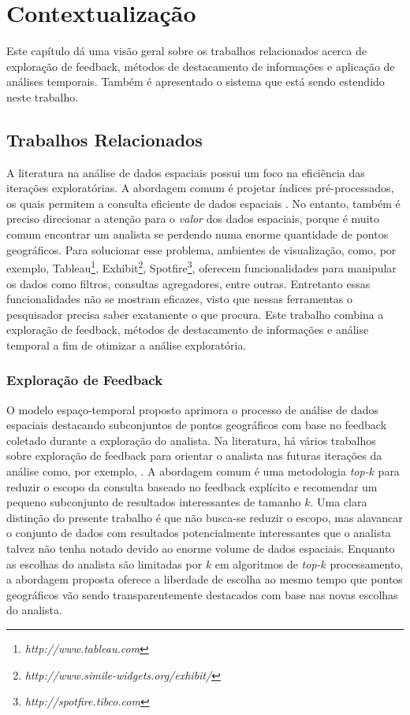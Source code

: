 \chapter{Contextualização}
\label{chap:contextualizacao}

Este capítulo dá uma visão geral sobre os trabalhos relacionados acerca de exploração de feedback, métodos de destacamento de informações e aplicação de análises temporais. Também é apresentado o sistema que está sendo estendido neste trabalho.

\section{Trabalhos Relacionados}

A literatura na análise de dados espaciais possui um foco na eficiência das iterações exploratórias. A abordagem comum é projetar índices pré-processados, os quais permitem a consulta eficiente de dados espaciais \cite{lins2013nanocubes}. No entanto, também é preciso direcionar a atenção para o {\em valor} dos dados espaciais, porque é muito comum encontrar um analista se perdendo numa enorme quantidade de pontos geográficos. Para solucionar esse problema, ambientes de visualização, como, por exemplo, Tableau\footnote{\em http://www.tableau.com}, Exhibit\footnote{\em http://www.simile-widgets.org/exhibit/}, Spotfire\footnote{\em  http://spotfire.tibco.com}, oferecem funcionalidades para manipular os dados como filtros, consultas agregadores, entre outras. Entretanto essas funcionalidades não se mostram eficazes, visto que nessas ferramentas o pesquisador precisa saber exatamente o que procura. Este trabalho combina a exploração de feedback, métodos de destacamento de informações e análise temporal a fim de otimizar a análise exploratória.

\subsection{Exploração de Feedback}

O modelo espaço-temporal proposto aprimora o processo de análise de dados espaciais destacando subconjuntos de pontos geográficos com base no feedback coletado durante a exploração do analista. Na literatura, há vários trabalhos sobre exploração de feedback para orientar o analista nas futuras iterações da análise como, por exemplo, . A abordagem comum é uma metodologia {\em top-$k$} para reduzir o escopo da consulta baseado no feedback explícito e recomendar um pequeno subconjunto de resultados interessantes de tamanho $k$. Uma clara distinção do presente trabalho é que não busca-se reduzir o escopo, mas alavancar o conjunto de dados com resultados potencialmente interessantes que o analista talvez não tenha notado devido ao enorme volume de dados espaciais. Enquanto as escolhas do analista são limitadas por $k$ em algoritmos de {\em top-$k$} processamento, a abordagem proposta oferece a liberdade de escolha ao mesmo tempo que pontos geográficos vão sendo transparentemente destacados com base nas novas escolhas do analista.


